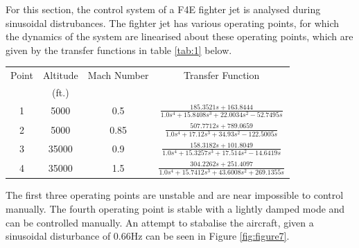 \documentclass[8pt]{article}
\begin{document}
For this section, the control system of a F4E fighter jet is analysed during sinusoidal distrubances.
The fighter jet has various operating points, for which the dynamics of the system are linearised about these operating points, which are given by the transfer functions in table \ref{tab:1} below.

\renewcommand{\arraystretch}{2}
\begin{center}
    \begin{tabular}{|c|c|c|c|}
    \hline 
    Point & Altitude  &  Mach Number & Transfer Function\\
    & (ft.) & & \\
    \hline 
    1 & 5000 & 0.5 & $\frac{185.3521 s + 163.8444}{1.0 s^{4} + 15.8408 s^{3} + 22.0034 s^{2} - 52.7495 s}$ \\
    2 & 5000 & 0.85 & $\frac{507.7712 s + 789.0659}{1.0 s^{4} + 17.12 s^{3} + 34.93 s^{2} - 122.5005 s}$ \\
    3 & 35000 & 0.9 & $\frac{158.3182 s + 101.8049}{1.0 s^{4} + 15.3257 s^{3} + 17.514 s^{2} - 14.6419 s}$ \\
    4 & 35000 & 1.5 & $\frac{304.2262 s + 251.4097}{1.0 s^{4} + 15.7412 s^{3} + 43.6008 s^{2} + 269.1355 s}$ \\
    \hline
    \end{tabular}
    \label{tab:1}
\end{center}

The first three operating points are unstable and are near impossible to control manually.
The fourth operating point is stable with a lightly damped mode and can be controlled manually.
An attempt to stabalise the aircraft, given a sinusoidal disturbance of $0.66$Hz can be seen in Figure \ref{fig:figure7}.
\end{document}
